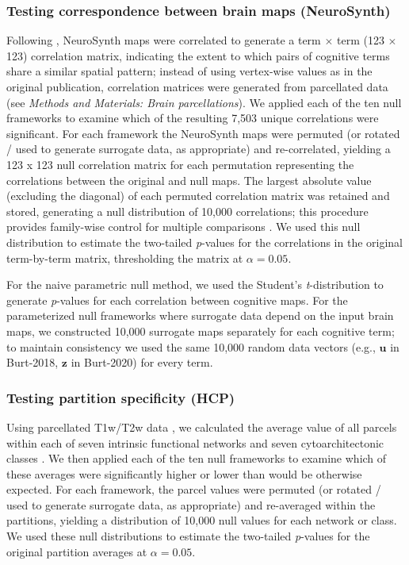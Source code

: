 \documentclass[12pt,aps,pra,reprint,showkeys]{revtex4-1}
\begin{document}
\subsubsection*{Testing correspondence between brain maps (NeuroSynth)}

Following \citet{alexanderbloch2018neuroimage}, NeuroSynth maps were correlated to generate a term $\times$ term (123 $\times$ 123) correlation matrix, indicating the extent to which pairs of cognitive terms share a similar spatial pattern; instead of using vertex-wise values as in the original publication, correlation matrices were generated from parcellated data (see \textit{Methods and Materials: Brain parcellations}).
We applied each of the ten null frameworks to examine which of the resulting 7,503 unique correlations were significant.
For each framework the NeuroSynth maps were permuted (or rotated / used to generate surrogate data, as appropriate) and re-correlated, yielding a 123 x 123 null correlation matrix  for each permutation representing the correlations between the original and null maps.
The largest absolute value (excluding the diagonal) of each permuted correlation matrix was retained and stored, generating a null distribution of 10,000 correlations; this procedure provides family-wise control for multiple comparisons \citep{alexanderbloch2018neuroimage, westfall1993resampling}.
We used this null distribution to estimate the two-tailed \emph{p}-values for the correlations in the original term-by-term matrix, thresholding the matrix at $\alpha = 0.05$.

For the naive parametric null method, we used the Student's \emph{t}-distribution to generate \emph{p}-values for each correlation between cognitive maps.
For the parameterized null frameworks where surrogate data depend on the input brain maps, we constructed 10,000 surrogate maps separately for each cognitive term; to maintain consistency we used the same 10,000 random data vectors (e.g., $\mathbf{u}$ in Burt-2018, $\mathbf{z}$ in Burt-2020) for every term.

\subsubsection*{Testing partition specificity (HCP)}

Using parcellated T1w/T2w data \citep{vanessen2013neuroimage}, we calculated the average value of all parcels within each of seven intrinsic functional networks \citep{yeo2011organization} and seven cytoarchitectonic classes \citep{voneconomo1925cytoarchitecture, scholtens2018neuroimage}.
We then applied each of the ten null frameworks to examine which of these averages were significantly higher or lower than would be otherwise expected.
For each framework, the parcel values were permuted (or rotated / used to generate surrogate data, as appropriate) and re-averaged within the partitions, yielding a distribution of 10,000 null values for each network or class.
We used these null distributions to estimate the two-tailed \emph{p}-values for the original partition averages at $\alpha = 0.05$.
\end{document}
